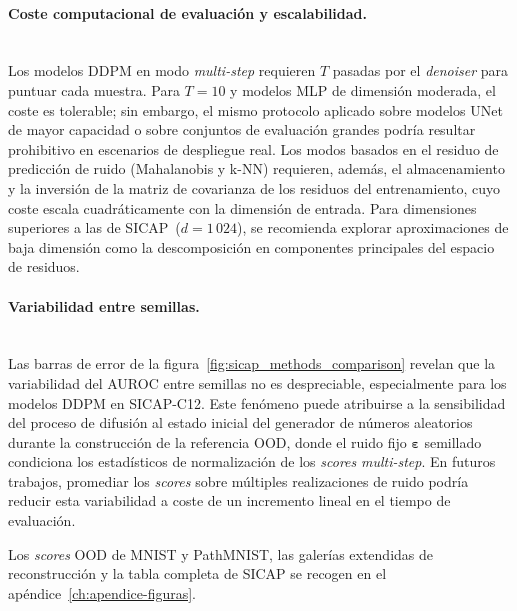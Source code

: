 \paragraph{Coste computacional de evaluación y escalabilidad.}~\\
Los modelos DDPM en modo \textit{multi-step} requieren $T$ pasadas por el
\textit{denoiser} para puntuar cada muestra. Para $T{=}10$ y modelos MLP de
dimensión moderada, el coste es tolerable; sin embargo, el mismo protocolo aplicado
sobre modelos UNet de mayor capacidad o sobre conjuntos de evaluación grandes
podría resultar prohibitivo en escenarios de despliegue real. Los modos basados en
el residuo de predicción de ruido (Mahalanobis y k-NN) requieren, además, el
almacenamiento y la inversión de la matriz de covarianza de los residuos del
entrenamiento, cuyo coste escala cuadráticamente con la dimensión de entrada.
Para dimensiones superiores a las de SICAP~($d{=}1\,024$), se recomienda explorar
aproximaciones de baja dimensión como la descomposición en componentes principales
del espacio de residuos.

\paragraph{Variabilidad entre semillas.}~\\
Las barras de error de la figura~\ref{fig:sicap_methods_comparison} revelan que
la variabilidad del AUROC entre semillas no es despreciable, especialmente para
los modelos DDPM en SICAP-C12. Este fenómeno puede atribuirse a la sensibilidad
del proceso de difusión al estado inicial del generador de números aleatorios durante
la construcción de la referencia OOD, donde el ruido fijo $\boldsymbol{\varepsilon}$
semillado condiciona los estadísticos de normalización de los \textit{scores}
\textit{multi-step}. En futuros trabajos, promediar los \textit{scores} sobre
múltiples realizaciones de ruido podría reducir esta variabilidad a coste de un
incremento lineal en el tiempo de evaluación.

Los \textit{scores} OOD de MNIST y PathMNIST, las galerías extendidas de
reconstrucción y la tabla completa de SICAP se recogen en el
apéndice~\ref{ch:apendice-figuras}.

\endinput
